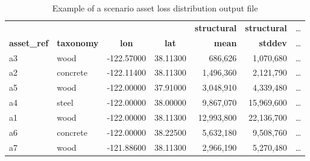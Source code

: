 \begin{table}[htbp]
\centering
\begin{tabular}{llccrrc}
\hline
\rowcolor{lightgray}
& & & & \textbf{structural} & \textbf{structural} & \ldots \\
\rowcolor{lightgray}
\textbf{asset\_ref} & \textbf{taxonomy} & \textbf{lon} & \textbf{lat} & \textbf{mean} & \textbf{stddev} & \ldots \\ \hline
a3 & wood & -122.57000 & 38.11300 & 686,626 & 1,070,680 & \ldots \\
a2 & concrete & -122.11400 & 38.11300 & 1,496,360 & 2,121,790 & \ldots \\
a5 & wood & -122.00000 & 37.91000 & 3,048,910 & 4,339,480 & \ldots \\
a4 & steel & -122.00000 & 38.00000 & 9,867,070 & 15,969,600 & \ldots \\
a1 & wood & -122.00000 & 38.11300 & 12,993,800 & 22,136,700 & \ldots \\
a6 & concrete & -122.00000 & 38.22500 & 5,632,180 & 9,508,760 & \ldots \\
a7 & wood & -121.88600 & 38.11300 & 2,966,190 & 5,270,480 & \ldots \\
\hline
\end{tabular}
\caption{Example of a scenario asset loss distribution output file}
\label{output:scenario_loss_asset}
\end{table}


